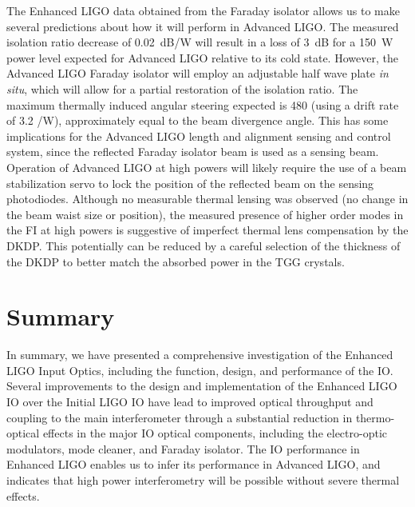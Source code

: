 The Enhanced LIGO data obtained from the Faraday isolator allows us to
make several predictions about how it will perform in Advanced LIGO.
The measured isolation ratio decrease of 0.02~dB/W will result in a
loss of 3~dB for a 150~W power level expected for Advanced LIGO
relative to its cold state.  However, the Advanced LIGO Faraday
isolator will employ an adjustable half wave plate \emph{in situ},
which will allow for a partial restoration of the isolation ratio. The
maximum thermally induced angular steering expected is 480 \microrad
(using a drift rate of 3.2 \microrad/W), approximately equal to the
beam divergence angle. This has some implications for the Advanced
LIGO length and alignment sensing and control system, since the
reflected Faraday isolator beam is used as a sensing beam. Operation
of Advanced LIGO at high powers will likely require the use of a beam
stabilization servo to lock the position of the reflected beam on the
sensing photodiodes.  Although no measurable thermal lensing was
observed (no change in the beam waist size or position), the measured
presence of higher order modes in the FI at high powers is suggestive
of imperfect thermal lens compensation by the DKDP.  This potentially
can be reduced by a careful selection of the thickness of the DKDP to
better match the absorbed power in the TGG crystals.

\section{Summary}
\label{sec:summary}
In summary, we have presented a comprehensive investigation of the
Enhanced LIGO Input Optics, including the function, design, and
performance of the IO.  Several improvements to the design and
implementation of the Enhanced LIGO IO over the Initial LIGO IO have
lead to improved optical throughput and coupling to the main
interferometer through a substantial reduction in thermo-optical
effects in the major IO optical components, including the
electro-optic modulators, mode cleaner, and Faraday isolator.  The IO
performance in Enhanced LIGO enables us to infer its performance in
Advanced LIGO, and indicates that high power interferometry will be
possible without severe thermal effects.



